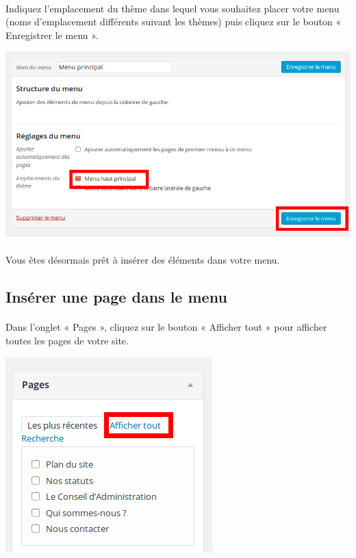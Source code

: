 \documentclass[10pt,a4paper]{article}
\begin{document}
\paragraph{}Indiquez l'emplacement du thème dans lequel vous souhaitez placer votre menu (noms d'emplacement différents suivant les thèmes) puis cliquez sur le bouton « Enregistrer le menu ».
\begin{center}
\includegraphics[scale=0.3]{img/0146.png}
\end{center}
\paragraph{}Vous êtes désormais prêt à insérer des éléments dans votre menu.
\newpage
\subsection{Insérer une page dans le menu}
\paragraph{}Dans l'onglet « Pages », cliquez sur le bouton « Afficher tout » pour afficher toutes les pages de votre site.
\begin{center}
\includegraphics[scale=0.3]{img/0147.png}
\end{center}
\end{document}
